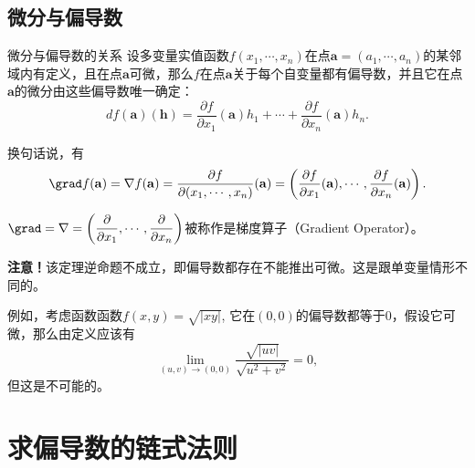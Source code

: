 \subsection{微分与偏导数}


\begin{frame}

\begin{block}{微分与偏导数的关系}
设多变量实值函数$f(x_1,\cdots,x_n)$在点$\mathbf{a} = (a_1,\cdots,a_n)$的某邻域内有定义，且在点$\mathbf{a}$可微，那么$f$在点$\mathbf{a}$关于每个自变量都有偏导数，并且它在点$\mathbf{a}$的微分由这些偏导数唯一确定：
$$df(\mathbf{a})(\mathbf{h}) = \dfrac{\partial f}{\partial x_1}(\mathbf{a})h_1 + \cdots + \dfrac{\partial f}{\partial x_n}(\mathbf{a})h_n.$$

\pause

换句话说，有
\begin{align*}
\grad f(\mathbf{a}) = \nabla f(\mathbf{a}) = \dfrac{\partial f}{\partial(x_1,\cdots,x_n)}(\mathbf{a})  = \left(\dfrac{\partial f}{\partial x_1} ( \mathbf{a}), \cdots, \dfrac{\partial f}{\partial x_n}(\mathbf{a}) \right).
\end{align*}

\pause
\(\displaystyle \grad = \nabla = \left(\dfrac{\partial}{\partial x_1}, \cdots, \dfrac{\partial}{\partial x_n} \right)\)被称作是梯度算子（Gradient Operator）。
\end{block}

\end{frame}


\begin{frame}

{\bfseries 注意！}该定理逆命题不成立，即偏导数都存在不能推出可微。这是跟单变量情形不同的。

\pause

例如，考虑函数函数\(\displaystyle f(x,y) = \sqrt{|xy|}\), 它在$(0,0)$的偏导数都等于$0$，假设它可微，那么由定义应该有
$$\lim\limits_{(u,v)\to(0,0)} \dfrac{\sqrt{|uv|}}{\sqrt{u^2+v^2}} = 0,$$
但这是不可能的。

\end{frame}


\section{求偏导数的链式法则}

